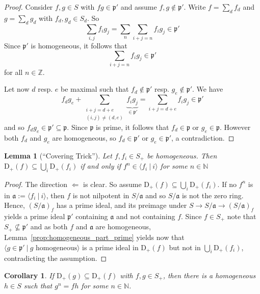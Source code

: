 \documentclass{scrartcl}
\newcommand{\N}{\mathbb{N}}
\newcommand{\Z}{\mathbb{Z}}
\newcommand{\D}[1]{\mathrm{D}_+(#1)}
\newcommand{\p}{\mathfrak{p}}
\renewcommand{\a}{\mathfrak{a}}
\newtheorem{lemma}[subsection]{Lemma}
\newtheorem{corollary}[subsection]{Corollary}
\theoremstyle{definition}
\begin{document}
\begin{proof}
    Consider $f, g \in S$ with $f g \in \p'$ and assume $f, g \notin \p'$.
    Write $f = \sum_d f_d$ and $g = \sum_d g_d$ with $f_d, g_d \in S_d$.
    So
    \begin{equation*}
        \sum_{i, j} f_i g_j = \sum_n \sum_{i + j = n} f_i g_j \in \p'
    \end{equation*}
    Since $\p'$ is homogeneous, it follows that
    \begin{equation*}
        \sum_{i + j = n} f_i g_j \in \p'
    \end{equation*}
    for all $n \in \Z$.

    Let now $d$ resp. $e$ be maximal such that $f_d \notin \p'$ resp. $g_e \notin \p'$.
    We have
    \begin{equation*}
        f_d g_e + \sum_{\substack{i + j = d + e\\(i, j) \neq (d, e)}} \underbrace{f_i g_j}_{\in \p'} = \sum_{i + j = d + e} f_i g_j \in \p'
    \end{equation*}
    and so $f_d g_e \in \p' \subseteq \p$.
    Since $\p$ is prime, it follows that $f_d \in \p$ or $g_e \in \p$.
    However both $f_d$ and $g_e$ are homogeneous, so $f_d \in \p'$ or $g_e \in \p'$, a contradiction.
\end{proof}
\begin{lemma}[``Covering Trick'']
    \label{prop:covering_trick}
    Let $f, f_i \in S_+$ be homogeneous.
    Then $\D{f} \subseteq \bigcup_i \D{f_i}$ if and only if $f^n \in \langle f_i \ | \ i \rangle$ for some $n \in \N$
\end{lemma}
\begin{proof}
    The direction $\Leftarrow$ is clear.
    So assume $\D{f} \subseteq \bigcup_i \D{f_i}$.
    If no $f^n$ is in $\a := \langle f_i \ | \ i \rangle$, then $f$ is not nilpotent in $S/\a$ and so $S/\a$ is not the zero ring.
    Hence, $(S/\a)_f$ has a prime ideal, and its preimage under $S \to S/\a \to (S/\a)_f$ yields a prime ideal $\p'$ containing $\a$ and not containing $f$.
    Since $f \in S_+$ note that $S_+ \not\subseteq \p'$ and as both $f$ and $\a$ are homogeneous, Lemma~\ref{prop:homogeneous_part_prime} yields now that $\langle g \in \p' \ | \ \text{$g$ homogeneous} \rangle$ is a prime ideal in $\D{f}$ but not in $\bigcup_i \D{f_i}$, contradicting the assumption.
\end{proof}
\begin{corollary}
    \label{prop:basic_set_inclusion_divisibility}
    If $\D{g} \subseteq \D{f}$ with $f, g \in S_+$, then there is a homogeneous $h \in S$ such that $g^n = fh$ for some $n \in \N$.
\end{corollary}
\end{document}
